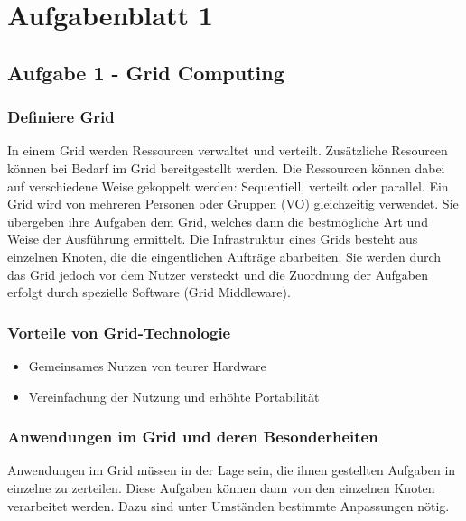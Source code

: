 \section{Aufgabenblatt 1}

\subsection{Aufgabe 1 - Grid Computing}

\subsubsection{Definiere Grid}
	In einem Grid werden Ressourcen verwaltet und verteilt.
	Zus\"atzliche Resourcen k\"onnen bei Bedarf im Grid bereitgestellt werden.
	Die Ressourcen k\"onnen dabei auf verschiedene Weise gekoppelt werden:
	Sequentiell, verteilt oder parallel.
	Ein Grid wird von mehreren Personen oder Gruppen (VO) gleichzeitig verwendet.
	Sie \"ubergeben ihre Aufgaben dem Grid, welches dann die bestm\"ogliche Art und Weise der Ausf\"uhrung ermittelt.
	Die Infrastruktur eines Grids besteht aus einzelnen Knoten,
	die die eingentlichen Auftr\"age abarbeiten.
	Sie werden durch das Grid jedoch vor dem Nutzer versteckt und die Zuordnung der
	Aufgaben erfolgt durch spezielle Software (Grid Middleware).
	
\subsubsection{Vorteile von Grid-Technologie}
	\begin{itemize}
	  \item Gemeinsames Nutzen von teurer Hardware
	  \item Vereinfachung der Nutzung und erh\"ohte Portabilit\"at
	\end{itemize}
	
\subsubsection{Anwendungen im Grid und deren Besonderheiten}
	Anwendungen im Grid m\"ussen in der Lage sein,
	die ihnen gestellten Aufgaben in einzelne zu zerteilen.
	Diese Aufgaben k\"onnen dann von den einzelnen Knoten verarbeitet werden.
	Dazu sind unter Umst\"anden bestimmte Anpassungen n\"otig.
	

